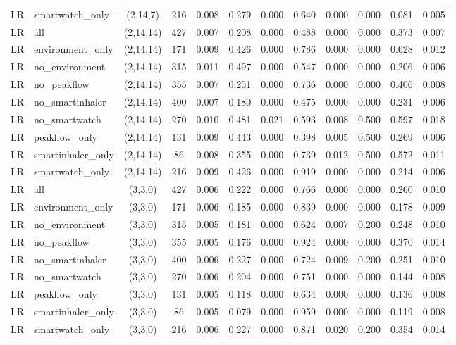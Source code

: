 \begin{longtable}{llcccccccccc}
LR & smartwatch\_only & (2,14,7) & 216 & 0.008 & 0.279 & 0.000 & 0.640 & 0.000 & 0.000 & 0.081 & 0.005 \\
LR & all & (2,14,14) & 427 & 0.007 & 0.208 & 0.000 & 0.488 & 0.000 & 0.000 & 0.373 & 0.007 \\
LR & environment\_only & (2,14,14) & 171 & 0.009 & 0.426 & 0.000 & 0.786 & 0.000 & 0.000 & 0.628 & 0.012 \\
LR & no\_environment & (2,14,14) & 315 & 0.011 & 0.497 & 0.000 & 0.547 & 0.000 & 0.000 & 0.206 & 0.006 \\
LR & no\_peakflow & (2,14,14) & 355 & 0.007 & 0.251 & 0.000 & 0.736 & 0.000 & 0.000 & 0.406 & 0.008 \\
LR & no\_smartinhaler & (2,14,14) & 400 & 0.007 & 0.180 & 0.000 & 0.475 & 0.000 & 0.000 & 0.231 & 0.006 \\
LR & no\_smartwatch & (2,14,14) & 270 & 0.010 & 0.481 & 0.021 & 0.593 & 0.008 & 0.500 & 0.597 & 0.018 \\
LR & peakflow\_only & (2,14,14) & 131 & 0.009 & 0.443 & 0.000 & 0.398 & 0.005 & 0.500 & 0.269 & 0.006 \\
LR & smartinhaler\_only & (2,14,14) & 86 & 0.008 & 0.355 & 0.000 & 0.739 & 0.012 & 0.500 & 0.572 & 0.011 \\
LR & smartwatch\_only & (2,14,14) & 216 & 0.009 & 0.426 & 0.000 & 0.919 & 0.000 & 0.000 & 0.214 & 0.006 \\
LR & all & (3,3,0) & 427 & 0.006 & 0.222 & 0.000 & 0.766 & 0.000 & 0.000 & 0.260 & 0.010 \\
LR & environment\_only & (3,3,0) & 171 & 0.006 & 0.185 & 0.000 & 0.839 & 0.000 & 0.000 & 0.178 & 0.009 \\
LR & no\_environment & (3,3,0) & 315 & 0.005 & 0.181 & 0.000 & 0.624 & 0.007 & 0.200 & 0.248 & 0.010 \\
LR & no\_peakflow & (3,3,0) & 355 & 0.005 & 0.176 & 0.000 & 0.924 & 0.000 & 0.000 & 0.370 & 0.014 \\
LR & no\_smartinhaler & (3,3,0) & 400 & 0.006 & 0.227 & 0.000 & 0.724 & 0.009 & 0.200 & 0.251 & 0.010 \\
LR & no\_smartwatch & (3,3,0) & 270 & 0.006 & 0.204 & 0.000 & 0.751 & 0.000 & 0.000 & 0.144 & 0.008 \\
LR & peakflow\_only & (3,3,0) & 131 & 0.005 & 0.118 & 0.000 & 0.634 & 0.000 & 0.000 & 0.136 & 0.008 \\
LR & smartinhaler\_only & (3,3,0) & 86 & 0.005 & 0.079 & 0.000 & 0.959 & 0.000 & 0.000 & 0.119 & 0.008 \\
LR & smartwatch\_only & (3,3,0) & 216 & 0.006 & 0.227 & 0.000 & 0.871 & 0.020 & 0.200 & 0.354 & 0.014 \\

\end{longtable}
